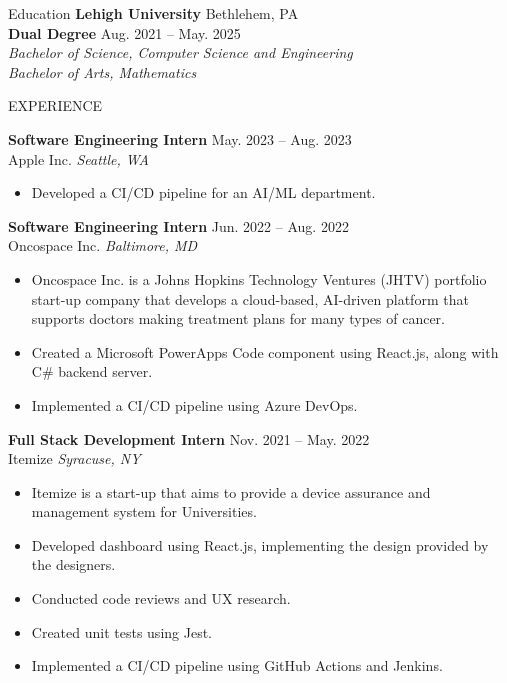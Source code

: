 \documentclass{resume}
\begin{document}
\begin{rSection}{Education}
{\bf Lehigh University} \hfill { Bethlehem, PA } \\
{\bf Dual Degree} \hfill {Aug. 2021 – May. 2025} \\
{\emph{Bachelor of Science, Computer Science and Engineering}} \\
{\emph{Bachelor of Arts, Mathematics}} \\
\end{rSection}

\begin{rSection}{EXPERIENCE}

\textbf{Software Engineering Intern} \hfill May. 2023 – Aug. 2023\\
Apple Inc. \hfill \textit{Seattle, WA}
\begin{itemize}
    \itemsep -5pt {} 
     \item Developed a CI/CD pipeline for an AI/ML department.
 \end{itemize}
 
\textbf{Software Engineering Intern} \hfill Jun. 2022 – Aug. 2022\\
Oncospace Inc. \hfill \textit{Baltimore, MD}
 \begin{itemize}
    \itemsep -5pt {} 
        \item Oncospace Inc. is a Johns Hopkins Technology Ventures (JHTV) portfolio start-up company that develops a cloud-based, AI-driven platform that supports doctors making treatment plans for many types of cancer.
        \item Created a Microsoft PowerApps Code component using React.js, along with C$\#$ backend server.
        \item Implemented a CI/CD pipeline using Azure DevOps.
 \end{itemize}

 \textbf{Full Stack Development Intern} \hfill Nov. 2021 – May. 2022\\
Itemize \hfill \textit{Syracuse, NY}
  \begin{itemize}
     \itemsep -5pt {} 
         \item Itemize is a start-up that aims to provide a device assurance and management system for Universities.
         \item Developed dashboard using React.js, implementing the design provided by the designers.
         \item Conducted code reviews and UX research.
         \item Created unit tests using Jest.
         \item Implemented a CI/CD pipeline using GitHub Actions and Jenkins.
  \end{itemize}


\end{rSection}
\end{document}
